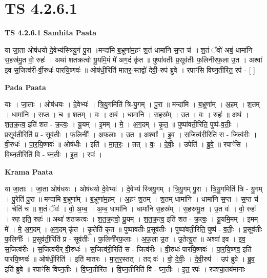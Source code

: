 \documentclass[17pt]{extarticle}
\begin{document}
\section{ TS 4.2.6.1 }

\textbf{TS 4.2.6.1 } \newline
\textbf{Samhita Paata} \newline

या जा॒ता ओष॑धयो दे॒वेभ्य॑स्त्रियु॒गं पु॒रा ।मन्दा॑मि ब॒भ्रूणा॑म॒हꣳ श॒तं धामा॑नि स॒प्त च॑ ॥ श॒तं ॅवो॑ अबं॒ धामा॑नि स॒हस्र॑मु॒त वो॒ रुहः॑ । अथा॑ शतक्रत्वो यू॒यमि॒मं मे॑ अग॒दं कृ॑त ॥ पुष्पा॑वतीः प्र॒सूव॑तीः फ॒लिनी॑रफ॒ला उ॒त । अश्वा॑ इव स॒जित्व॑री-र्वी॒रुधः॑ पारयि॒ष्णवः॑ ॥ ओष॑धी॒रिति॑ मातर॒-स्तद्वो॑ देवी॒-रुप॑ ब्रुवे । रपाꣳ॑सि विघ्न॒तीरि॑त॒ रप॑ - [  ] \newline

\textbf{Pada Paata} \newline

याः । जा॒ताः । ओष॑धयः । दे॒वेभ्यः॑ । त्रि॒यु॒गमिति॑ त्रि-यु॒गम् । पु॒रा ॥ मन्दा॑मि । ब॒भ्रूणा᳚म् । अ॒हम् । श॒तम् । धामा॑नि । स॒प्त । च॒ ॥ श॒तम् । वः॒ । अ॒बं॒ । धामा॑नि । स॒हस्र᳚म् । उ॒त । वः॒ । रुहः॑ ॥ अथ॑ । श॒त॒क्र॒त्व॒ इति॑ शत - क्र॒त्वः॒ । यू॒यम् । इ॒मम् । मे॒ । अ॒ग॒दम् । कृ॒त॒ ॥ पुष्पा॑वती॒रिति॒ पुष्प॑-व॒तीः॒ । प्र॒सूव॑ती॒रिति॑ प्र - सूव॑तीः । फ॒लिनीः᳚ । अ॒फ॒लाः । उ॒त ॥ अश्वाः᳚ । इ॒व॒ । स॒जित्व॑री॒रिति॑ स - जित्व॑रीः । वी॒रुधः॑ । पा॒र॒यि॒ष्णवः॑ ॥ ओष॑धीः । इति॑ । मा॒त॒रः॒ । तत् । वः॒ । दे॒वीः॒ । उपेति॑ । ब्रु॒वे॒ ॥ रपाꣳ॑सि । वि॒घ्न॒तीरिति॑ वि - घ्न॒तीः । इ॒त॒ । रपः॑ ।  \newline


\textbf{Krama Paata} \newline

या जा॒ताः । जा॒ता ओष॑धयः । ओष॑धयो दे॒वेभ्यः॑ । दे॒वेभ्य॑ स्त्रियु॒गम् । त्रि॒यु॒गम् पु॒रा । त्रि॒यु॒गमिति॑ त्रि - यु॒गम् । पु॒रेति॑ पु॒रा ॥ मन्दा॑मि ब॒भ्रूणा᳚म् । ब॒भ्रूणा॑म॒हम् । अ॒हꣳ श॒तम् । श॒तम् धामा॑नि । धामा॑नि स॒प्त । स॒प्त च॑ । चेति॑ च ॥ श॒तं ॅवः॑ । वो॒ अ॒म्ब॒ । अ॒म्ब॒ धामा॑नि । धामा॑नि स॒हस्र᳚म् । स॒हस्र॑मु॒त । उ॒त वः॑ । वो॒ रुहः॑ । रुह॒ इति॒ रुहः॑ ॥ अथा॑ शतक्रत्वः । श॒त॒क्र॒त्वो॒ यू॒यम् । श॒त॒क्र॒त्व॒ इति॑ शत - क्र॒त्वः॒ । यू॒यमि॒मम् । इ॒मम् मे᳚ । मे॒ अ॒ग॒दम् । अ॒ग॒दम् कृ॑त । कृ॒तेति॑ कृत ॥ पुष्पा॑वतीः प्र॒सूव॑तीः । पुष्पा॑वती॒रिति॒ पुष्प॑ - व॒तीः॒ । प्र॒सूव॑तीः फ॒लिनीः᳚ । प्र॒सूव॑ती॒रिति॑ प्र - सूव॑तीः । फ॒लिनी॑रफ॒लाः । अ॒फ॒ला उ॒त । उ॒तेत्यु॒त ॥ अश्वा॑ इव । इ॒व॒ स॒जित्व॑रीः । स॒जित्व॑रीर् वी॒रुधः॑ । स॒जित्व॑री॒रिति॑ स - जित्व॑रीः । वी॒रुधः॑ पारयि॒ष्णवः॑ । पा॒र॒यि॒ष्णव॒ इति॑ पारयि॒ष्णवः॑ ॥ ओष॑धी॒रिति॑ । इति॑ मातरः । मा॒त॒र॒स्तत् । तद् वः॑ । वो॒ दे॒वीः॒ । दे॒वी॒रुप॑ । उप॑ ब्रुवे । ब्रु॒व॒ इति॑ ब्रुवे ॥ रपाꣳ॑सि विघ्न॒तीः । वि॒घ्न॒तीरि॑त । वि॒घ्न॒तीरिति॑ वि - घ्न॒तीः । इ॒त॒ रपः॑ । रप॑श्चा॒तय॑मानाः \newline
\end{document}
